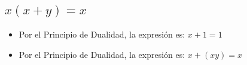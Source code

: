 \documentclass[answers]{exam}
\begin{document}
\begin{questions}
{\begin{parts}
      \part{$x(x + y) = x$}
    \end{parts}}
  \begin{solution}
    \begin{itemize}
      \item Por el Principio de Dualidad, la expresión es: $x+1=1$
      \item Por el Principio de Dualidad, la expresión es: $x+(xy)=x$
    \end{itemize}
  \end{solution}
\end{questions}
\end{document}
